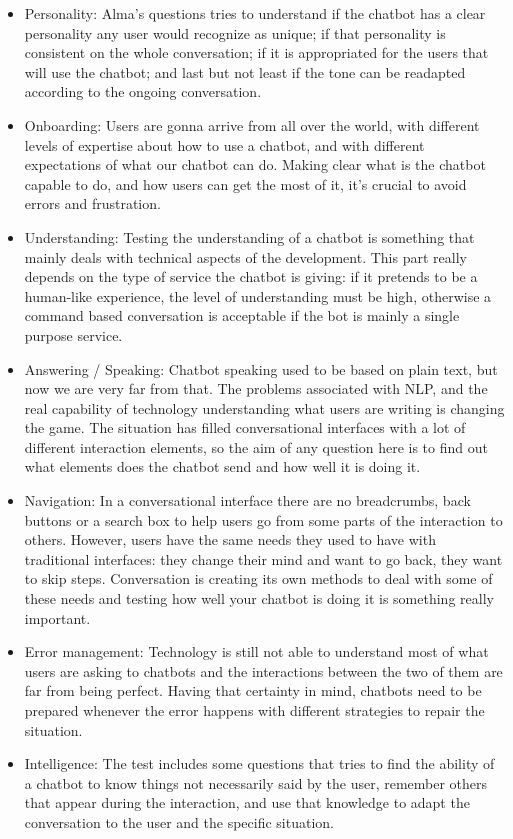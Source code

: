 \documentclass[b5paper,10pt,twoside,cucitura]{toptesi}
\begin{document}
\begin{itemize}
    \item Personality: Alma's questions tries to understand if the chatbot has a clear personality any user would recognize as unique; if that personality is consistent on the whole conversation; if it is appropriated for the users that will use the chatbot; and last but not least if the tone can be readapted according to the ongoing conversation.
    
    \item Onboarding: Users are gonna arrive from all over the world, with different levels of expertise about how to use a chatbot, and with different expectations of what our chatbot can do. Making clear what is the chatbot capable to do, and how users can get the most of it, it’s crucial to avoid errors and frustration.
	
	\item Understanding: Testing the understanding of a chatbot is something that mainly deals with technical aspects of the development. This part really depends on the type of service the chatbot is giving: if it pretends to be a human-like experience, the level of understanding must be high, otherwise a command based conversation is acceptable if the bot is mainly a single purpose service.
	
	\item Answering / Speaking: Chatbot speaking used to be based on plain text, but now we are very far from that. The problems associated with NLP, and the real capability of technology understanding what users are writing is changing the game. The situation has filled conversational interfaces with a lot of different interaction elements, so the aim of any question here is to find out what elements does the chatbot send and how well it is doing it. 
	
	\item Navigation: In a conversational interface there are no breadcrumbs, back buttons or a search box to help users go from some parts of the interaction to others. However, users have the same needs they used to have with traditional interfaces: they change their mind and want to go back, they want to skip steps. Conversation is creating its own methods to deal with some of these needs and testing how well your chatbot is doing it is something really important.
	
	\item Error management: Technology is still not able to understand most of what users are asking to chatbots and the interactions between the two of them are far from being perfect. Having that certainty in mind, chatbots need to be prepared whenever the error happens with different strategies to repair the situation.
	
	\item Intelligence: The test includes some questions that tries to find the ability of a chatbot to know things not necessarily said by the user, remember others that appear during the interaction, and use that knowledge to adapt the conversation to the user and the specific situation.
\end{itemize}
\pagebreak
\end{document}
